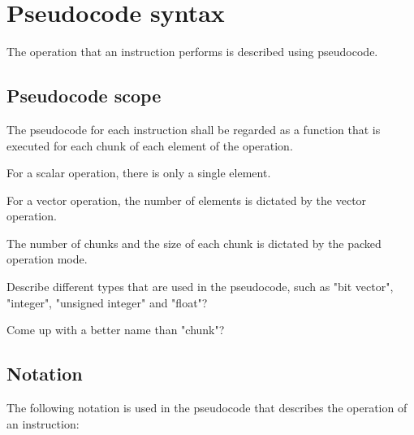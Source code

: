 \section{Pseudocode syntax}

The operation that an instruction performs is described using pseudocode.

\subsection{Pseudocode scope}

The pseudocode for each instruction shall be regarded as a function that is
executed for each chunk of each element of the operation.

For a scalar operation, there is only a single element.

For a vector operation, the number of elements is dictated by the vector
operation.

The number of chunks and the size of each chunk is dictated by the packed
operation mode.

\begin{todobox}
Describe different types that are used in the pseudocode, such as
"bit vector", "integer", "unsigned integer" and "float"?

Come up with a better name than "chunk"?
\end{todobox}

\subsection{Notation}

The following notation is used in the pseudocode that describes the operation
of an instruction:

